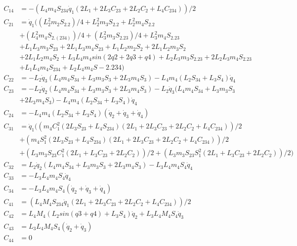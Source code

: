\begin{equation}
\begin{split}
 	C_{14} 	& = -(L_{4} m_{4} S_{234} \dot{q}_{1} (2 L_{1} + 2 L_{3} C_{23} + 2 L_{2} C_{2} + L_{4} C_{234}))/2\\
	C_{21} 	& = \dot{q}_{1} ((L_{2}^2 m_{2} S_{2.2})/4 + L_{2}^2 m_{3} S_{2.2} + L_{2}^2 m_{4} S_{2.2} \\
			& + (L_{4}^2 m_{4} S_{2.(234)})/4 + (L_{3}^2 m_{3} S_{2.23})/4 + L_{3}^2 m_{4} S_{2.23} \\
			& + L_{1} L_{3} m_{3} S_{23} + 2 L_{1} L_{3} m_{4} S_{23} + L_{1} L_{2} m_{2} S_{2} + 2 L_{1} L_{2} m_{3} S_{2} \\
			& + 2 L_{1} L_{2} m_{4} S_{2} + L_{3} L_{4} m_{4} sin(2 q2 + 2 q3 + q4) + L_{2} L_{3} m_{3} S_{2.23} + 2 L_{2} L_{3} m_{4} S_{2.23} \\
			& + L_{1} L_{4} m_{4} S_{234} + L_{2} L_{4} m_{4} S-{2.234})\\
   	C_{22} 	& = -L_{2} \dot{q}_{3} (L_{4} m_{4} S_{34} + L_{3} m_{3} S_{3} + 2 L_{3} m_{4} S_{3}) - L_{4} m_{4} (L_{2} S_{34} + L_{3} S_{4}) \dot{q}_{4}\\
   	C_{23} 	& = -L_{2} \dot{q}_{2} (L_{4} m_{4} S_{34} + L_{3} m_{3} S_{3} + 2 L_{3} m_{4} S_{3}) - L_{2} \dot{q}_{3} (L_{4} m_{4} S_{34} + L_{3} m_{3} S_{3} \\
   			& + 2 L_{3} m_{4} S_{3}) - L_{4} m_{4} (L_{2} S_{34} + L_{3} S_{4}) \dot{q}_{4}\\
    C_{24} 	& = -L_{4} m_{4} (L_{2} S_{34} + L_{3} S_{4}) (\dot{q}_{2} + \dot{q}_{3} + \dot{q}_{4})\\
 	C_{31} 	& = \dot{q}_{1} ((m_{4} C_{1}^2 (2 L_{3} S_{23} + L_{4} S_{234}) (2 L_{1} + 2 L_{3} C_{23} + 2 L_{2} C_{2} + L_{4} C_{234}))/2 \\
 			& + (m_{4} S_{1}^2 (2 L_{3} S_{23} + L_{4} S_{234}) (2 L_{1} + 2 L_{3} C_{23} + 2 L_{2} C_{2} + L_{4} C_{234}))/2 \\
 			& + (L_{3} m_{3} S_{23} C_{1}^2 (2 L_{1} + L_{3} C_{23} + 2 L_{2} C_{2}))/2 + (L_{3} m_{3} S_{23} S_{1}^2 (2 L_{1} + L_{3} C_{23} + 2 L_{2} C_{2}))/2)\\
    C_{32} 	& = L_{2} \dot{q}_{2} (L_{4} m_{4} S_{34} + L_{3} m_{3} S_{3} + 2 L_{3} m_{4} S_{3}) - L_{3} L_{4} m_{4} S_{4} \dot{q}_{4}\\
   	C_{33} 	& =  -L_{3} L_{4} m_{4} S_{4} \dot{q}_{4}\\
    C_{34} 	& = -L_{3} L_{4} m_{4} S_{4} (\dot{q}_{2} + \dot{q}_{3} + \dot{q}_{4})\\
    C_{41} 	& = (L_{4} M_{4} S_{234} \dot{q}_{1} (2 L_{1} + 2 L_{3} C_{23} + 2 L_{2} C_{2} + L_{4} C_{234}))/2\\
    C_{42} 	& = L_{4} M_{4} (L_{2} sin(q3 + q4) + L_{3} S_{4}) \dot{q}_{2} + L_{3} L_{4} M_{4} S_{4} \dot{q}_{3}\\
    C_{43} 	& = L_{3} L_{4} M_{4} S_{4} (\dot{q}_{2} + \dot{q}_{3})\\
    C_{44} 	& = 0
	\end{split}
\end{equation}


